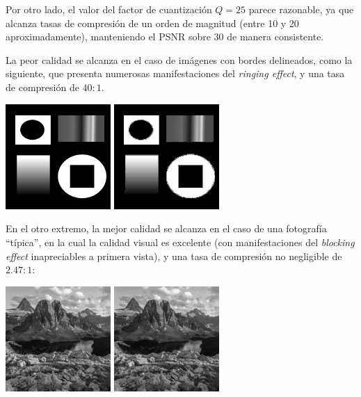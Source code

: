 \documentclass{article}
\begin{document}
Por otro lado, el valor del factor de cuantización $Q = 25$
parece razonable,
ya que alcanza tasas de compresión de un orden de magnitud
(entre 10 y 20 aproximadamente), manteniendo el PSNR sobre 30
de manera consistente.

La peor calidad se alcanza en el caso de imágenes con bordes delineados,
como la siguiente, que presenta numerosas manifestaciones del {\em ringing effect},
y una tasa de compresión de $40 : 1$.

\begin{center}
\includegraphics[width=4cm]{../imgs/input/imgs_gray/img00.png}
\includegraphics[width=4cm]{../imgs/output/gray_8_25_1000000/img00.png}
\end{center}

En el otro extremo, la mejor calidad se alcanza en el caso
de una fotografía ``típica'', en la cual la calidad visual es excelente
(con manifestaciones del {\em blocking effect} inapreciables a primera vista),
y una tasa de compresión no negligible de $2.47 : 1$:

\begin{center}
\includegraphics[width=4cm]{../imgs/input/imgs_gray/img01.png}
\includegraphics[width=4cm]{../imgs/output/gray_8_25_1000000/img01.png}
\end{center}
\end{document}

